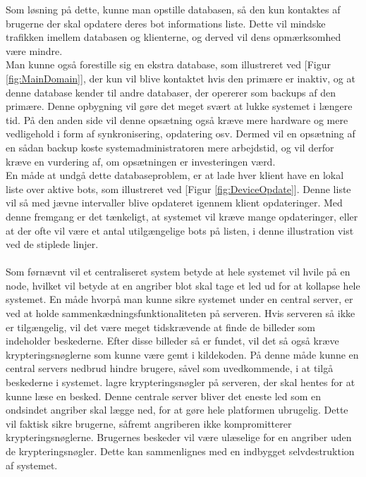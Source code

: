 Som løsning på dette, kunne man opstille databasen, så den kun kontaktes af brugerne der skal opdatere deres bot informations liste. Dette vil mindske trafikken imellem databasen og klienterne, og derved vil dens opmærksomhed være mindre.\\
% 
Man kunne også forestille sig en ekstra database, som illustreret ved [Figur \ref{fig:MainDomain}], der kun vil blive kontaktet hvis den primære er inaktiv, og at denne database kender til andre databaser, der opererer som backups af den primære. Denne opbygning vil gøre det meget svært at lukke systemet i længere tid. På den anden side vil denne opsætning også kræve mere hardware og mere vedligehold i form af synkronisering, opdatering osv. Dermed vil en opsætning af en sådan backup koste systemadministratoren mere arbejdstid, og vil derfor kræve en vurdering af, om opsætningen er investeringen værd.\\
% 
En måde at undgå dette databaseproblem, er at lade hver klient have en lokal liste over aktive bots, som illustreret ved [Figur \ref{fig:DeviceOpdate}]. Denne liste vil så med jævne intervaller blive opdateret igennem klient opdateringer. Med denne fremgang er det tænkeligt, at systemet vil kræve mange opdateringer, eller at der ofte vil være et antal utilgængelige bots på listen, i denne illustration vist ved de stiplede linjer.
\\\\
Som førnævnt vil et centraliseret system betyde at hele systemet vil hvile på en node, hvilket vil betyde at en angriber blot skal tage et led ud for at kollapse hele systemet. 
En måde hvorpå man kunne sikre systemet under en central server, er ved at holde sammenkædningsfunktionaliteten på serveren. Hvis serveren så ikke er tilgængelig, vil det være meget tidskrævende at finde de billeder som indeholder beskederne. Efter disse billeder så er fundet, vil det så også kræve krypteringsnøglerne som kunne være gemt i kildekoden. På denne måde kunne en central servers nedbrud hindre brugere, såvel som uvedkommende, i at tilgå beskederne i systemet. lagre krypteringsnøgler på serveren, der skal hentes for at kunne læse en besked. Denne centrale server bliver det eneste led som en ondsindet angriber skal lægge ned, for at gøre hele platformen ubrugelig. Dette vil faktisk sikre brugerne, såfremt angriberen ikke kompromitterer krypteringsnøglerne. Brugernes beskeder vil være ulæselige for en angriber uden de krypteringsnøgler. Dette kan sammenlignes med en indbygget selvdestruktion af systemet.\\
